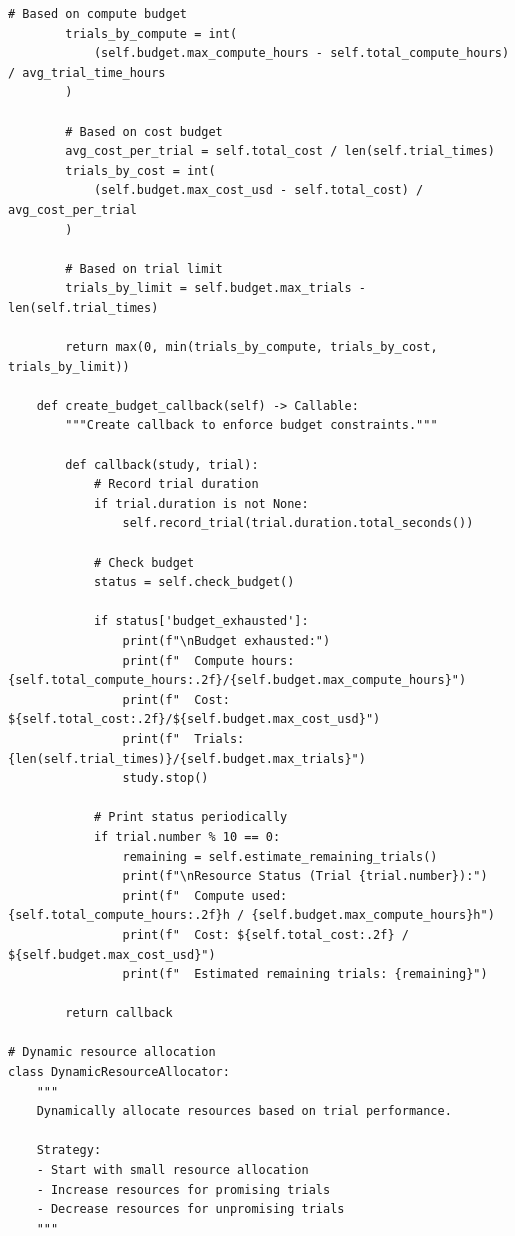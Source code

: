 \begin{lstlisting}[style=python, caption=Resource management for cost-effective HPO]
        # Based on compute budget
        trials_by_compute = int(
            (self.budget.max_compute_hours - self.total_compute_hours) / avg_trial_time_hours
        )

        # Based on cost budget
        avg_cost_per_trial = self.total_cost / len(self.trial_times)
        trials_by_cost = int(
            (self.budget.max_cost_usd - self.total_cost) / avg_cost_per_trial
        )

        # Based on trial limit
        trials_by_limit = self.budget.max_trials - len(self.trial_times)

        return max(0, min(trials_by_compute, trials_by_cost, trials_by_limit))

    def create_budget_callback(self) -> Callable:
        """Create callback to enforce budget constraints."""

        def callback(study, trial):
            # Record trial duration
            if trial.duration is not None:
                self.record_trial(trial.duration.total_seconds())

            # Check budget
            status = self.check_budget()

            if status['budget_exhausted']:
                print(f"\nBudget exhausted:")
                print(f"  Compute hours: {self.total_compute_hours:.2f}/{self.budget.max_compute_hours}")
                print(f"  Cost: ${self.total_cost:.2f}/${self.budget.max_cost_usd}")
                print(f"  Trials: {len(self.trial_times)}/{self.budget.max_trials}")
                study.stop()

            # Print status periodically
            if trial.number % 10 == 0:
                remaining = self.estimate_remaining_trials()
                print(f"\nResource Status (Trial {trial.number}):")
                print(f"  Compute used: {self.total_compute_hours:.2f}h / {self.budget.max_compute_hours}h")
                print(f"  Cost: ${self.total_cost:.2f} / ${self.budget.max_cost_usd}")
                print(f"  Estimated remaining trials: {remaining}")

        return callback

# Dynamic resource allocation
class DynamicResourceAllocator:
    """
    Dynamically allocate resources based on trial performance.

    Strategy:
    - Start with small resource allocation
    - Increase resources for promising trials
    - Decrease resources for unpromising trials
    """


\end{lstlisting}
